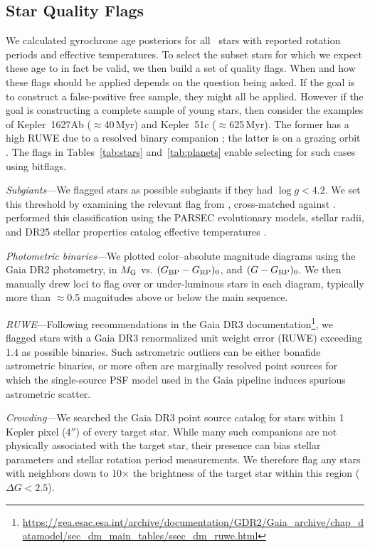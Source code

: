 \documentclass[11pt,twocolumn,tighten]{aastex63}
\begin{document}
\subsection{Star Quality Flags}
\label{subsec:flags}
We calculated gyrochrone age posteriors for all \nuniqstarsantosrot\
stars with reported rotation periods and effective temperatures.  To
select the subset stars for which we expect these age to in fact be
valid, we then build a set of quality flags.  When and
how these flags should be applied depends on the question being asked.
If the goal is to construct a false-positive free sample, they might
all be applied.
However if the goal is constructing a complete sample of young stars,
then consider the examples of Kepler~1627Ab ($\approx$40\,Myr) and
Kepler~51c ($\approx$625\,Myr).  The former has a high RUWE due to a
resolved binary companion \citep{Bouma_2022a}; the latter is on a
grazing orbit \citep{2014ApJ...783...53M}.  
The flags in Tables~\ref{tab:stars} and~\ref{tab:planets} enable
selecting for such cases using bitflags.

{\it Subgiants}---We flagged stars as possible subgiants if they had
$\log g < 4.2$.  We set this threshold by examining the
relevant flag from \citet{berger_2018_radii_evolnstates},
cross-matched against \citet{Berger_2020a_catalog}.
\citet{berger_2018_radii_evolnstates} performed this classification
using the PARSEC evolutionary models, stellar radii, and DR25 stellar
properties catalog effective temperatures \citep{Mathur_2017}.

{\it Photometric binaries}---We plotted color--absolute magnitude
diagrams using the Gaia DR2 photometry, in $M_{\rm G}$ vs. $(G_{\rm
BP} - G_{\rm RP})_0$, and $(G - G_{\rm RP})_0$.  We then manually drew
loci to flag over or under-luminous stars in each diagram, typically
more than $\approx$0.5 magnitudes above or below the main sequence.

{\it RUWE}---Following recommendations in the Gaia DR3
documentation\footnote{\url{https://gea.esac.esa.int/archive/documentation/GDR2/Gaia_archive/chap_datamodel/sec_dm_main_tables/ssec_dm_ruwe.html}},
we flagged stars with a Gaia DR3 renormalized unit weight error (RUWE)
exceeding 1.4 as possible binaries.  Such astrometric outliers can be
either bonafide astrometric binaries, or more often are marginally
resolved point sources for which the single-source PSF model used in
the Gaia pipeline induces spurious astrometric scatter.

{\it Crowding}---We searched the Gaia DR3 point source catalog for
stars within 1 Kepler pixel (4$''$) of every target star.
While many such companions are not physically associated with the
target star, their presence can bias stellar parameters and stellar
rotation period measurements.
We therefore flag any stars with neighbors down to 10$\times$ the 
brightness of the target star within this region ($\Delta G < 2.5$).
\end{document}
